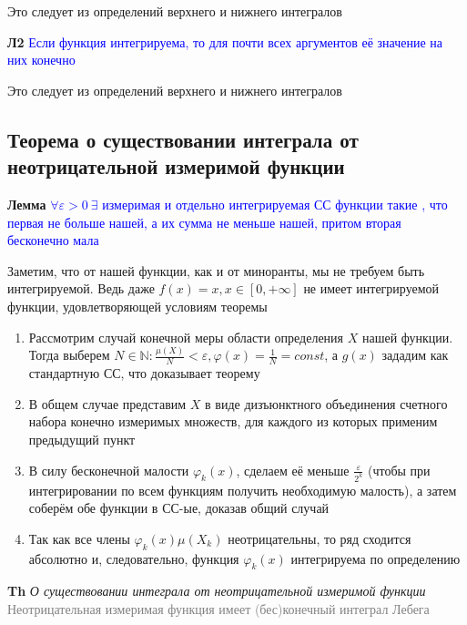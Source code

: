Это следует из определений верхнего и нижнего интегралов

\textbf{Л2} \textcolor{blue}{Если функция интегрируема, то для почти всех аргументов её значение на них конечно}

Это следует из определений верхнего и нижнего интегралов

\subsection{Теорема о существовании интеграла от неотрицательной измеримой функции}

\textbf{Лемма} \textcolor{blue}{$\forall \varepsilon > 0~\exists$ измеримая и отдельно интегрируемая СС функции такие
    , что первая не больше нашей, а их сумма не меньше нашей, притом вторая бесконечно мала}

Заметим, что от нашей функции, как и от миноранты, мы не требуем быть интегрируемой.
Ведь даже $f(x) = x, x \in [0, +\infty]$ не имеет интегрируемой функции, удовлетворяющей условиям теоремы

\begin{enumerate}
    \item Рассмотрим случай конечной меры области определения $X$ нашей функции.
    Тогда выберем $N \in \mathbb{N}: \frac{\mu(X)}{N} < \varepsilon, \varphi(x) = \frac{1}{N} = const$, а $g(x)$ зададим
    как стандартную СС, что доказывает теорему
    \item В общем случае представим $X$ в виде дизъюнктного объединения счетного набора конечно измеримых
    множеств, для каждого из которых применим предыдущий пункт
    \item В силу бесконечной малости $\varphi_k(x)$, сделаем её меньше $\frac{\varepsilon}{2^k}$ (чтобы при
    интегрировании по всем функциям получить необходимую малость), а затем соберём обе функции в СС-ые, доказав
    общий случай
    \item Так как все члены $\varphi_k(x) \mu (X_k)$ неотрицательны, то ряд сходится абсолютно и, следовательно, функция
    $\varphi_k(x)$ интегрируема по определению
\end{enumerate}

\textbf{Th} \textit{О существовании интеграла от неотрицательной измеримой функции} \textcolor{gray}{
    Неотрицательная измеримая функция имеет (бес)конечный интеграл Лебега}

